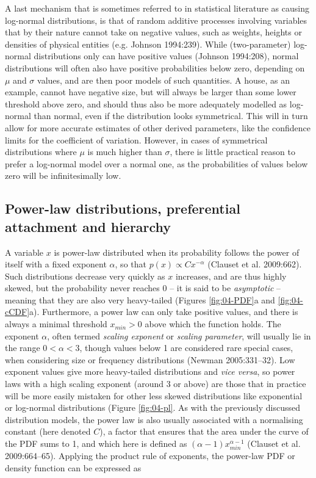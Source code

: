 \documentclass[
  12pt,
]{book}
\begin{document}
A last mechanism that is sometimes referred to in statistical literature as causing log-normal distributions, is that of random additive processes involving variables that by their nature cannot take on negative values, such as weights, heights or densities of physical entities (e.g. Johnson 1994:239). While (two-parameter) log-normal distributions only can have positive values (Johnson 1994:208), normal distributions will often also have positive probabilities below zero, depending on \(\mu\) and \(\sigma\) values, and are then poor models of such quantities. A house, as an example, cannot have negative size, but will always be larger than some lower threshold above zero, and should thus also be more adequately modelled as log-normal than normal, even if the distribution looks symmetrical. This will in turn allow for more accurate estimates of other derived parameters, like the confidence limits for the coefficient of variation. However, in cases of symmetrical distributions where \(\mu\) is much higher than \(\sigma\), there is little practical reason to prefer a log-normal model over a normal one, as the probabilities of values below zero will be infinitesimally low.

\FloatBarrier

\hypertarget{power-law}{%
\subsection{Power-law distributions, preferential attachment and hierarchy}\label{power-law}}

A variable \(x\) is power-law distributed when its probability follows the power of itself with a fixed exponent \(\alpha\), so that \(p(x) \propto Cx^{-\alpha}\) (Clauset et al. 2009:662). Such distributions decrease very quickly as \(x\) increases, and are thus highly skewed, but the probability never reaches 0 -- it is said to be \emph{asymptotic} -- meaning that they are also very heavy-tailed (Figures \ref{fig:04-PDF}a and \ref{fig:04-cCDF}a). Furthermore, a power law can only take positive values, and there is always a minimal threshold \(x_{min} > 0\) above which the function holds. The exponent \(\alpha\), often termed \emph{scaling exponent} or \emph{scaling parameter}, will usually lie in the range \(0 < \alpha < 3\), though values below 1 are considered rare special cases, when considering size or frequency distributions (Newman 2005:331--32). Low exponent values give more heavy-tailed distributions and \emph{vice versa}, so power laws with a high scaling exponent (around 3 or above) are those that in practice will be more easily mistaken for other less skewed distributions like exponential or log-normal distributions (Figure \ref{fig:04-pl}. As with the previously discussed distribution models, the power law is also usually associated with a normalising constant (here denoted \(C\)), a factor that ensures that the area under the curve of the PDF sums to 1, and which here is defined as \((\alpha-1)x_{min}^{\alpha-1}\) (Clauset et al. 2009:664--65). Applying the product rule of exponents, the power-law PDF or density function can be expressed as
\end{document}
